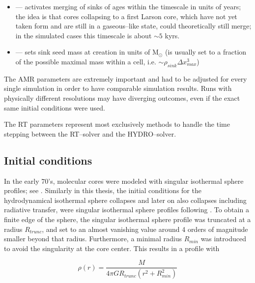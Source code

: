 \begin{itemize}
\begin{itemize}
    \item {} --- activates merging of sinks of ages within the timescale in units of years; the idea is that cores collapsing to a first Larson core, which have not yet taken form and are still in a gaseous--like state, could theoretically still merge; in the simulated cases this timescale is about $\sim5$ kyrs.\\[-9pt]
    \item {} --- sets sink seed mass at creation in units of M$_{\odot}$ (is usually set to a fraction of the possible maximal mass within a cell, i.e. $\sim\rho_{sink}\Delta x_{max}^{3}$)\\[-3pt]
  \end{itemize}
\end{itemize}

The AMR parameters are extremely important and had to be adjusted for every single simulation in order to have comparable simulation results.
Runs with physically different resolutions may have diverging outcomes, even if the exact same initial conditions were used.

The RT parameters represent most exclusively methods to handle the time stepping between the RT--solver and the HYDRO--solver.


\subsection{Initial conditions}
\label{subsec:Initial_conditions}

In the early 70's, molecular cores were modeled with singular isothermal sphere profiles; see \citet{Larson_paper, Shu_paper}.
Similarly in this thesis, the initial conditions for the hydrodynamical isothermal sphere collapses and later on also collapses including radiative transfer, were singular isothermal sphere profiles following .
To obtain a finite edge of the sphere, the singular isothermal sphere profile was truncated at a radius $R_{trunc}$, and set to an almost vanishing value around 4 orders of magnitude smaller beyond that radius.
Furthermore, a minimal radius $R_{min}$ was introduced to avoid the singularity at the core center.
This results in a profile with

\begin{equation}
  \rho(r) = \frac{M}{4\pi G R_{trunc}(r^{2} + R_{min}^{2})}
\label{eq:nsis}
\end{equation}

